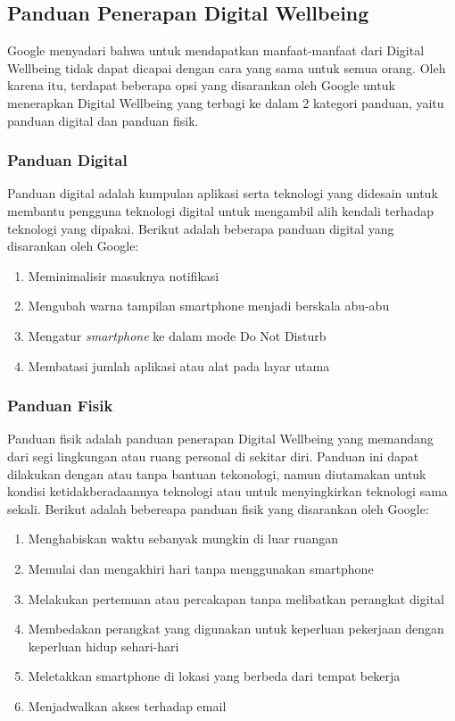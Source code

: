   \subsection{Panduan Penerapan Digital Wellbeing}
  
  Google menyadari bahwa untuk mendapatkan manfaat-manfaat dari Digital Wellbeing tidak dapat dicapai dengan cara yang sama untuk semua orang. Oleh karena itu, terdapat beberapa opsi yang disarankan oleh Google untuk menerapkan Digital Wellbeing yang terbagi ke dalam 2 kategori panduan, yaitu panduan digital dan panduan fisik.
  
  \subsubsection{Panduan Digital}
  
  Panduan digital adalah kumpulan aplikasi serta teknologi yang didesain untuk membantu pengguna teknologi digital untuk mengambil alih kendali terhadap teknologi yang dipakai. Berikut adalah beberapa panduan digital yang disarankan oleh Google:
  
  \begin{enumerate}
    \item Meminimalisir masuknya notifikasi
    \item Mengubah warna tampilan smartphone menjadi berskala abu-abu
    \item Mengatur \textit{smartphone} ke dalam mode Do Not Disturb
    \item Membatasi jumlah aplikasi atau alat pada layar utama
  \end{enumerate}

  \subsubsection{Panduan Fisik}

  Panduan fisik adalah panduan penerapan Digital Wellbeing yang memandang dari segi lingkungan atau ruang personal di sekitar diri. Panduan ini dapat dilakukan dengan atau tanpa bantuan tekonologi, namun diutamakan untuk kondisi ketidakberadaannya teknologi atau untuk menyingkirkan teknologi sama sekali. Berikut adalah bebereapa panduan fisik yang disarankan oleh Google:

  \begin{enumerate}
    \item Menghabiskan waktu sebanyak mungkin di luar ruangan
    \item Memulai dan mengakhiri hari tanpa menggunakan smartphone
    \item Melakukan pertemuan atau percakapan tanpa melibatkan perangkat digital
    \item Membedakan perangkat yang digunakan untuk keperluan pekerjaan dengan keperluan hidup sehari-hari
    \item Meletakkan smartphone di lokasi yang berbeda dari tempat bekerja
    \item Menjadwalkan akses terhadap email 
  \end{enumerate}

